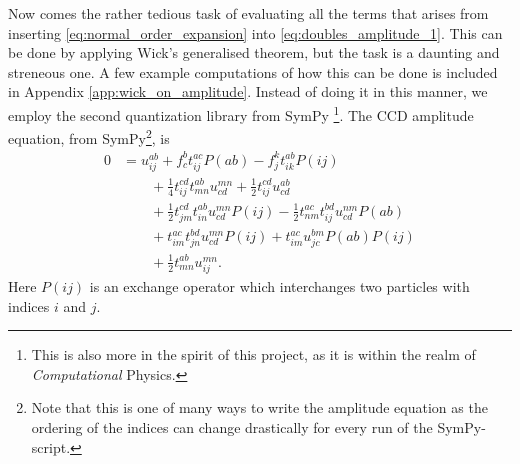 \documentclass[
    a4paper, aps, twocolumn, floatfix, superscriptaddress,
    nofootinbib]{revtex4-1}
\newcommand{\1}{\mathds{1}}
\begin{document}
            Now comes the rather tedious task of evaluating all the terms that
            arises from inserting \autoref{eq:normal_order_expansion} into
            \autoref{eq:doubles_amplitude_1}. This can be done by applying
            Wick's generalised theorem, but the task is a daunting and streneous
            one. A few example computations of how this can be done is included
            in Appendix \ref{app:wick_on_amplitude}. Instead of doing it in this
            manner, we employ the second quantization library from SymPy
            \footnote{This is also more in the spirit of this project, as
            it is within the realm of \emph{Computational} Physics.}.  The CCD
            amplitude equation, from SymPy\footnote{Note that this is one of
            many ways to write the amplitude equation as the ordering of the
            indices can change drastically for every run of the SymPy-script.},
            is
            \begin{equation}
                \begin{aligned}
                    0 &= u^{ab}_{ij} + f^b_c t^{ac}_{ij}P(ab)
                    - f^k_jt^{ab}_{ik}P(ij)
                    \\
                    &\qquad
                    + \frac{1}{4}t^{cd}_{ij} t^{ab}_{mn} u^{mn}_{cd}
                    + \frac{1}{2}t^{cd}_{ij} u^{ab}_{cd}
                    \\
                    &\qquad
                    + \frac{1}{2}t^{cd}_{jm} t^{ab}_{in} u^{mn}_{cd} P(ij)
                    - \frac{1}{2}t^{ac}_{nm} t^{bd}_{ij} u^{nm}_{cd} P(ab)
                    \\
                    &\qquad
                    + t^{ac}_{im} t^{bd}_{jn} u^{mn}_{cd} P(ij)
                    + t^{ac}_{im} u^{bm}_{jc} P(ab) P(ij)
                    \\
                    &\qquad
                    + \frac{1}{2}t^{ab}_{mn} u^{mn}_{ij}.
                    \label{eq:CCD_amp_1}
                \end{aligned}
            \end{equation}
            Here $P(ij)$ is an exchange operator which interchanges two
            particles with indices $i$ and $j$.
\end{document}
